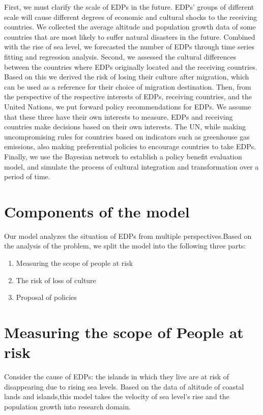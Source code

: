 \documentclass{mcmthesis}
\begin{document}
First, we must clarify the scale of EDPs in the future. EDPs' groups of different scale will cause different degrees of economic and cultural shocks to the receiving countries. We collected the average altitude and population growth data of some countries that are most likely to suffer natural disasters in the future. Combined with the rise of sea level, we forecasted the number of EDPs through time series fitting and regression analysis. Second, we assessed the cultural differences between the countries where EDPs originally located and the receiving countries. Based on this we derived the risk of losing their culture after migration, which can be used as a reference for their choice of migration destination. Then, from the perspective of the respective interests of EDPs, receiving countries, and the United Nations, we put forward policy recommendations for EDPs. We assume that these three have their own interests to measure. EDPs and receiving countries make decisions based on their own interests. The UN, while making uncompromising rules for countries based on indicators such as greenhouse gas emissions, also making preferential policies to encourage countries to take EDPs. Finally, we use the Bayesian network to establish a policy benefit evaluation model, and simulate the process of cultural integration and transformation over a period of time.

\section{Components of the model}
Our model analyzes the situation of EDPs from multiple perspectives.Based on the analysis of the problem, we split the model into the following three parts:
\begin{enumerate}
\item Measuring the scope of people at risk 
\item The risk of loss of culture
\item Proposal of policies
\end{enumerate}
\section{Measuring the scope of People at risk}

Consider the cause of EDPs: the islands in which they live are at risk of disappearing due to rising sea levels. Based on the data of altitude of coastal lands and islands,this model takes the velocity of sea level's rise and the population growth into research domain.
\end{document}
